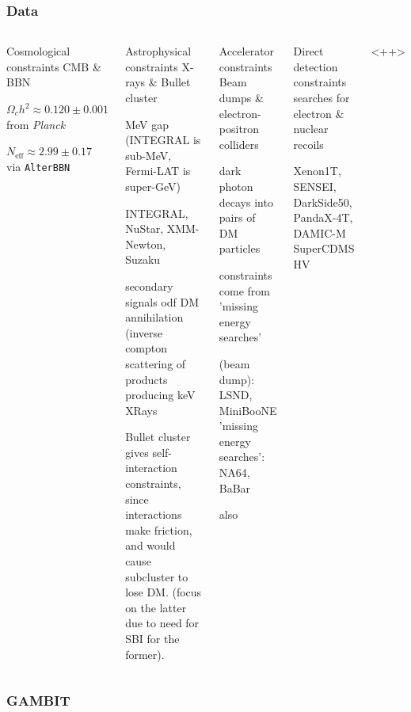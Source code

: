 \documentclass[aspectratio=169]{beamer}
\begin{document}
\begin{frame}
    \frametitle{Data}
    \begin{columns}
        \begin{block}{Cosmological constraints}
                CMB \& BBN

            $\Omega_c h^2 \approx 0.120\pm0.001$ from \textit{Planck}

            $N_\text{eff}\approx 2.99\pm 0.17$ via \texttt{AlterBBN}
        \end{block}
        \begin{block}{Astrophysical constraints}
            X-rays \& Bullet cluster

            MeV gap (INTEGRAL is sub-MeV, Fermi-LAT is super-GeV)

            INTEGRAL, NuStar, XMM-Newton, Suzaku

            secondary signals odf DM annihilation (inverse compton scattering of products producing keV XRays


                Bullet cluster gives self-interaction constraints, since interactions make friction, and would cause subcluster to lose DM. (focus on the latter due to need for SBI for the former).
        \end{block}
        \begin{block}{Accelerator constraints}
            Beam dumps \& electron-positron colliders

            dark photon decays into pairs of DM particles

            constraints come from 'missing energy searches' 

            (beam dump): LSND, MiniBooNE
            'missing energy searches': NA64, BaBar

            also 
        \end{block}
        \begin{block}{Direct detection constraints}
            searches for electron \& nuclear recoils

            Xenon1T, SENSEI, DarkSide50, PandaX-4T, DAMIC-M SuperCDMS HV
        \end{block}
        <++>
    \end{columns}
\end{frame}

\begin{frame}
    \frametitle{GAMBIT}
\end{frame}
\end{document}

